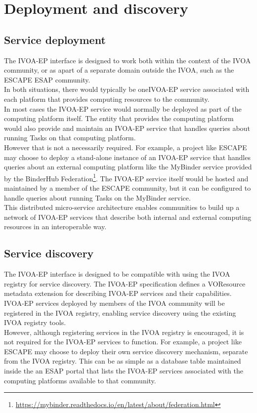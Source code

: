 \documentclass[11pt,a4paper]{ivoa}
\newcommand{\ivoep} {IVOA-EP\xspace}
\newcommand{\footurl}[1] {\footnote{\url{#1}}}
\begin{document}
\section{Deployment and discovery}
\label{sec:deployment-discovery}

\subsection{Service deployment}
\label{sec:service-deployment}
The \ivoep interface is designed to work both within the context of the IVOA community, or as apart of a separate domain outside the IVOA, such as the ESCAPE ESAP community.
\\
In both situations, there would typically be one\ivoep service associated with each platform that provides computing resources to the community.
\\
In most cases the \ivoep service would normally be deployed as part of the computing platform itself.
The entity that provides the computing platform would also provide and maintain an \ivoep service that handles queries about running Tasks on that computing platform.
\\
However that is not a necessarily required.
For example, a project like ESCAPE may choose to deploy a stand-alone instance of an \ivoep service that handles queries about an external computing platform like the MyBinder service provided by the BinderHub Federation\footurl{https://mybinder.readthedocs.io/en/latest/about/federation.html}.
The \ivoep service itself would be hosted and maintained by a member of the ESCAPE community, but it can be configured to handle queries about running Tasks on the MyBinder service.
\\
This distributed micro-service architecture enables communities to build up a network of \ivoep services that describe both internal and external computing resources in an interoperable way.
\\
\subsection{Service discovery}
\label{sec:service-discovery}
The \ivoep interface is designed to be compatible with using the IVOA registry for service discovery.
The \ivoep specification defines a VOResource metadata extension for describing \ivoep services and their capabilities.
\\
\ivoep services deployed by members of the IVOA community will be registered in the IVOA registry, enabling service discovery using the existing IVOA registry tools.
\\
However, although registering services in the IVOA registry is encouraged, it is not required for the \ivoep services to function.
For example, a project like ESCAPE may choose to deploy their own service discovery mechanism, separate from the IVOA registry.
This can be as simple as a database table maintained inside the an ESAP portal that lists the \ivoep services associated with the computing platforms available to that community.
\end{document}
